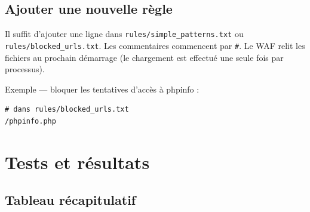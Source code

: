 \documentclass[12pt,a4paper]{article}
\begin{document}
\subsection{Ajouter une nouvelle règle}

Il suffit d'ajouter une ligne dans \texttt{rules/simple\_patterns.txt} ou \texttt{rules/blocked\_urls.txt}. Les commentaires commencent par \texttt{\#}. Le WAF relit les fichiers au prochain démarrage (le chargement est effectué une seule fois par processus).

Exemple --- bloquer les tentatives d'accès à phpinfo :

\begin{lstlisting}[style=bash]
# dans rules/blocked_urls.txt
/phpinfo.php
\end{lstlisting}

\section{Tests et résultats}

\subsection{Tableau récapitulatif}
\end{document}
